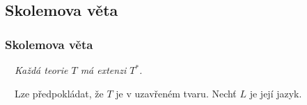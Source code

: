     
    
    
    



\subsection{Skolemova věta}\todo

\subsubsection*{Skolemova věta}
    
    {\bf {}}\ \ {\it Každá teorie $T$ má  extenzi $T^*$.}
    \medskip
    
    {\it {}}\ \ Lze předpokládat, že $T$ je v uzavřeném tvaru. Nechť $L$ je její jazyk.
    \vspace{0.5mm}
    
